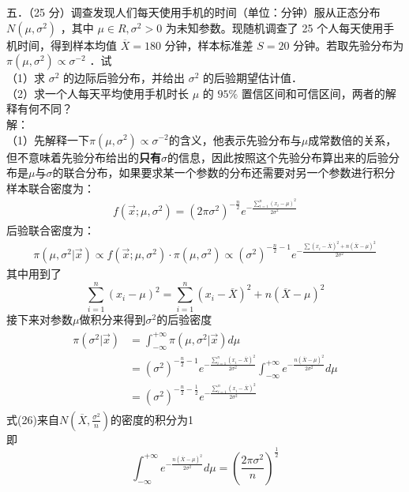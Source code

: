 \documentclass[UTF8,openany]{book}
\begin{document}
	
	\noindent 五．（25 分）调查发现人们每天使用手机的时间（单位：分钟）服从正态分布 $N\left(\mu, \sigma^{2}\right)$ ，其中 $\mu \in R, \sigma^{2}>0$ 为未知参数。现随机调查了 25 个人每天使用手机时间，得到样本均值 $\overline{X}=180$ 分钟，样本标准差 $S=20$ 分钟。若取先验分布为 $\pi\left(\mu, \sigma^{2}\right) \propto \sigma^{-2}$ ．试\\
	（1）求 $\sigma^{2}$ 的边际后验分布，并给出 $\sigma^{2}$ 的后验期望估计值．\\
	（2）求一个人每天平均使用手机时长 $\mu$ 的 $95 \%$ 置信区间和可信区间，两者的解释有何不同？\\
	解：\\
	（1）先解释一下$\pi\left(\mu, \sigma^{2}\right) \propto \sigma^{-2}$的含义，他表示先验分布与$\mu$成常数倍的关系，但不意味着先验分布给出的\textbf{只有}$\sigma$的信息，因此按照这个先验分布算出来的后验分布是$\mu$与$\sigma$的联合分布，如果要求某一个参数的分布还需要对另一个参数进行积分\\
	样本联合密度为：
	\begin{gather}
		f(\vec{x};\mu,\sigma^2)=(2\pi \sigma^2)^{-\frac{n}{2}}e^{-\frac{\sum_{i=1}^{n} (x_i-\mu)^2}{2\sigma^2}}
	\end{gather}
	后验联合密度为：
	\begin{gather}
		\pi(\mu,\sigma^2|\vec{x}) \propto f(\vec{x};\mu,\sigma^2)\cdot\pi\left(\mu, \sigma^{2}\right) \propto (\sigma^2)^{-\frac{n}{2}-1}e^{-\frac{\sum (x_i-\overline{X})^2 +n(\overline{X}-\mu)^2}{2\sigma^2}}
	\end{gather}
	其中用到了
	$$\sum_{i=1}^{n} (x_i-\mu)^2=\sum_{i=1}^{n} (x_i-\overline{X})^2 +n(\overline{X}-\mu)^2$$
	接下来对参数$\mu$做积分来得到$\sigma^2$的后验密度
	\begin{gather}
		\begin{aligned}
			\pi(\sigma^2|\vec{x})&=\int_{-\infty}^{+\infty} \pi(\mu , \sigma^2|\vec{x})d\mu\\
			&=(\sigma^2)^{-\frac{n}{2}-1}e^{-\frac{\sum_{i=1}^n (x_i-\overline{X})^2}{2\sigma^2}} \int_{-\infty}^{+\infty}e^{-\frac{n(\overline{X}-\mu)^2}{2\sigma^2}}d\mu\\
			&=(\sigma^2)^{-\frac{n}{2}-\frac{1}{2}}e^{-\frac{\sum_{i=1}^n (x_i-\overline{X})^2}{2\sigma^2}} 
		\end{aligned}
	\end{gather}
	式(26)来自$N(\overline{X},\frac{\sigma^2}{n})$的密度的积分为1\\
	即
	\[
	\int_{-\infty}^{+\infty}e^{-\frac{n(\overline{X}-\mu)^2}{2\sigma^2}}d\mu=(\frac{2\pi \sigma^2}{n})^{\frac{1}{2}}
	\]
\end{document}

